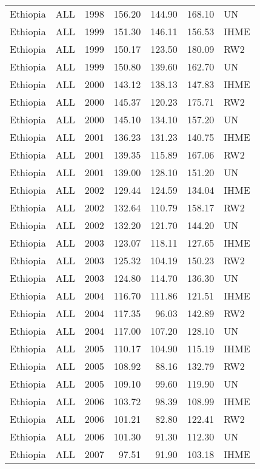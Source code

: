 \begin{longtable}{lllrrrl}
  Ethiopia & ALL & 1998 & 156.20 & 144.90 & 168.10 & UN \\ 
  Ethiopia & ALL & 1999 & 151.30 & 146.11 & 156.53 & IHME \\ 
  Ethiopia & ALL & 1999 & 150.17 & 123.50 & 180.09 & RW2 \\ 
  Ethiopia & ALL & 1999 & 150.80 & 139.60 & 162.70 & UN \\ 
  Ethiopia & ALL & 2000 & 143.12 & 138.13 & 147.83 & IHME \\ 
  Ethiopia & ALL & 2000 & 145.37 & 120.23 & 175.71 & RW2 \\ 
  Ethiopia & ALL & 2000 & 145.10 & 134.10 & 157.20 & UN \\ 
  Ethiopia & ALL & 2001 & 136.23 & 131.23 & 140.75 & IHME \\ 
  Ethiopia & ALL & 2001 & 139.35 & 115.89 & 167.06 & RW2 \\ 
  Ethiopia & ALL & 2001 & 139.00 & 128.10 & 151.20 & UN \\ 
  Ethiopia & ALL & 2002 & 129.44 & 124.59 & 134.04 & IHME \\ 
  Ethiopia & ALL & 2002 & 132.64 & 110.79 & 158.17 & RW2 \\ 
  Ethiopia & ALL & 2002 & 132.20 & 121.70 & 144.20 & UN \\ 
  Ethiopia & ALL & 2003 & 123.07 & 118.11 & 127.65 & IHME \\ 
  Ethiopia & ALL & 2003 & 125.32 & 104.19 & 150.23 & RW2 \\ 
  Ethiopia & ALL & 2003 & 124.80 & 114.70 & 136.30 & UN \\ 
  Ethiopia & ALL & 2004 & 116.70 & 111.86 & 121.51 & IHME \\ 
  Ethiopia & ALL & 2004 & 117.35 & 96.03 & 142.89 & RW2 \\ 
  Ethiopia & ALL & 2004 & 117.00 & 107.20 & 128.10 & UN \\ 
  Ethiopia & ALL & 2005 & 110.17 & 104.90 & 115.19 & IHME \\ 
  Ethiopia & ALL & 2005 & 108.92 & 88.16 & 132.79 & RW2 \\ 
  Ethiopia & ALL & 2005 & 109.10 & 99.60 & 119.90 & UN \\ 
  Ethiopia & ALL & 2006 & 103.72 & 98.39 & 108.99 & IHME \\ 
  Ethiopia & ALL & 2006 & 101.21 & 82.80 & 122.41 & RW2 \\ 
  Ethiopia & ALL & 2006 & 101.30 & 91.30 & 112.30 & UN \\ 
  Ethiopia & ALL & 2007 & 97.51 & 91.90 & 103.18 & IHME \\ 

\end{longtable}
